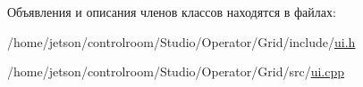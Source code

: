 Объявления и описания членов классов находятся в файлах\+:\begin{DoxyCompactItemize}
\item 
/home/jetson/controlroom/\+Studio/\+Operator/\+Grid/include/\hyperlink{_operator_2_grid_2include_2ui_8h}{ui.\+h}\item 
/home/jetson/controlroom/\+Studio/\+Operator/\+Grid/src/\hyperlink{_operator_2_grid_2src_2ui_8cpp}{ui.\+cpp}\end{DoxyCompactItemize}
